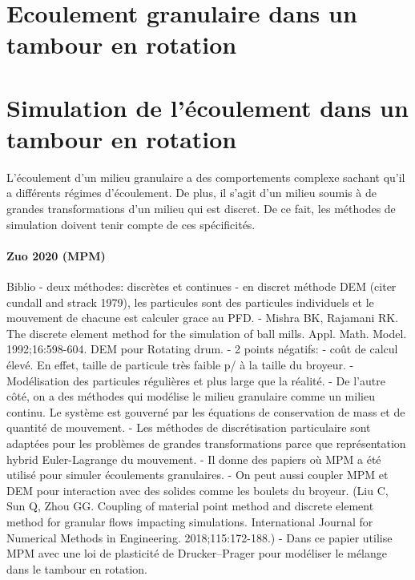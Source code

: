
\section{Ecoulement granulaire dans un tambour en rotation}


\section{Simulation de l'écoulement dans un tambour en rotation}

L'écoulement d'un milieu granulaire a des comportements complexe sachant qu'il a différents régimes d'écoulement.
De plus, il s'agit d'un milieu soumis à de grandes transformations d'un milieu qui est discret.
De ce fait, les méthodes de simulation doivent tenir compte de ces spécificités.


\paragraph*{Zuo 2020 (MPM)}
Biblio
- deux méthodes: discrètes et continues
- en discret méthode DEM (citer cundall and strack 1979), les particules sont des particules individuels et le mouvement de chacune est calculer grace au PFD.
- Mishra BK, Rajamani RK. The discrete element method for the simulation of ball mills. Appl. Math. Model. 1992;16:598-604. DEM pour Rotating drum.
- 2 points négatifs:
- coût de calcul élevé. En effet, taille de particule très faible p/ à la taille du broyeur.
- Modélisation des particules régulières et plus large que la réalité.
- De l'autre côté, on a des méthodes qui modélise le milieu granulaire comme un milieu continu. Le système est gouverné par les équations de conservation de mass et de quantité de mouvement.
- Les méthodes de discrétisation particulaire sont adaptées pour les problèmes de grandes transformations parce que représentation hybrid Euler-Lagrange du mouvement.
- Il donne des papiers où MPM a été utilisé pour simuler écoulements granulaires.
- On peut aussi coupler MPM et DEM pour interaction avec des solides comme les boulets du broyeur. (Liu C, Sun Q, Zhou GG. Coupling of material point method and discrete element method for granular flows impacting simulations. International Journal for Numerical Methods in Engineering. 2018;115:172-188.)
- Dans ce papier utilise MPM avec une loi de plasticité de Drucker–Prager pour modéliser le mélange dans le tambour en rotation.

